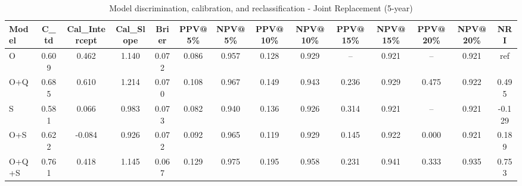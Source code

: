 \begin{table}[htbp]
\centering
\small
\caption{Model discrimination, calibration, and reclassification - Joint Replacement (5-year)}
\label{tab:perf_joint_5y}
\begin{tabular}{lccccccccccccc}
\toprule
Model & C\_td & Cal\_Intercept & Cal\_Slope & Brier & PPV@5\% & NPV@5\% & PPV@10\% & NPV@10\% & PPV@15\% & NPV@15\% & PPV@20\% & NPV@20\% & NRI \\
\midrule
O & 0.609 & 0.462 & 1.140 & 0.072 & 0.086 & 0.957 & 0.128 & 0.929 & -- & 0.921 & -- & 0.921 & ref \\
O+Q & 0.685 & 0.610 & 1.214 & 0.070 & 0.108 & 0.967 & 0.149 & 0.943 & 0.236 & 0.929 & 0.475 & 0.922 & 0.495 \\
S & 0.581 & 0.066 & 0.983 & 0.073 & 0.082 & 0.940 & 0.136 & 0.926 & 0.314 & 0.921 & -- & 0.921 & -0.129 \\
O+S & 0.622 & -0.084 & 0.926 & 0.072 & 0.092 & 0.965 & 0.119 & 0.929 & 0.145 & 0.922 & 0.000 & 0.921 & 0.189 \\
O+Q+S & 0.761 & 0.418 & 1.145 & 0.067 & 0.129 & 0.975 & 0.195 & 0.958 & 0.231 & 0.941 & 0.333 & 0.935 & 0.753 \\
\bottomrule
\end{tabular}
\end{table}